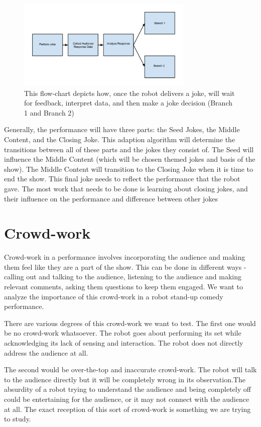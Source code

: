 \documentclass[onecolumn, draftclsnofoot,10pt, compsoc]{IEEEtran}
\begin{document}
\begin{figure}[H]
  \centering
  \includegraphics[width=0.75\textwidth,height=0.75\textheight,keepaspectratio]{fig1}
  \caption{ This flow-chart depicts how, once the robot delivers a joke, will wait for feedback, interpret data, and then make a joke decision (Branch 1 and Branch 2)}
\end{figure}

Generally, the performance will have three parts: the Seed Jokes, the Middle Content, and the Closing Joke. This adaption algorithm will determine the transitions between all of these parts and the jokes they consist of. The Seed will influence the Middle Content (which will be chosen themed jokes and basis of the show). The Middle Content will transition to the Closing Joke when it is time to end the show. This final joke needs to reflect the performance that the robot gave. The most work that needs to be done is learning about closing jokes, and their influence on the performance and difference between other jokes


\section{Crowd-work}
Crowd-work in a performance involves incorporating the audience and making them feel like they are a part of the show. This can be done in different ways -  calling out and talking to the audience, listening to the audience and making relevant comments, asking them questions to keep them engaged. We want to analyze the importance of this crowd-work in a robot stand-up comedy performance.

There are various degrees of this crowd-work we want to test. The first one would be no crowd-work whatsoever. The robot goes about performing its set while acknowledging its lack of sensing and interaction. The robot does not directly address the audience at all.

The second would be over-the-top and inaccurate crowd-work. The robot will talk to the audience directly but it will be completely wrong in its observation.The absurdity of a robot trying to understand the audience and being completely off could be entertaining for the audience, or it may not connect with the audience at all. The exact reception of this sort of crowd-work is something we are trying to study.
\end{document}
